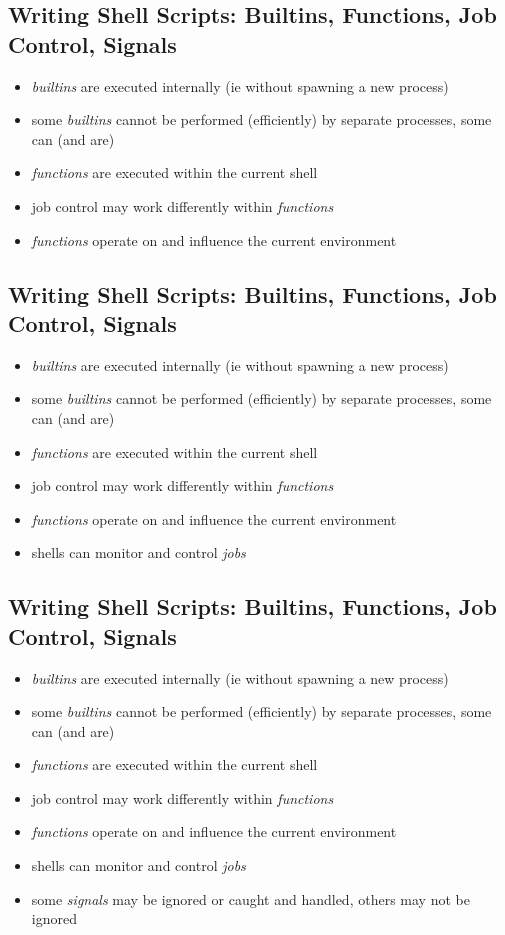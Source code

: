 \documentclass[xga]{xdvislides}
\begin{document}
\subsection{Writing Shell Scripts: Builtins, Functions, Job Control, Signals}
\begin{itemize}
	\item {\em builtins} are executed internally (ie without spawning a
		new process)
	\item some {\em builtins} cannot be performed (efficiently) by
		separate processes, some can (and are)
	\item {\em functions} are executed within the current shell
	\item job control may work differently within {\em functions}
	\item {\em functions} operate on and influence the current environment
\end{itemize}

\subsection{Writing Shell Scripts: Builtins, Functions, Job Control, Signals}
\begin{itemize}
	\item {\em builtins} are executed internally (ie without spawning a
		new process)
	\item some {\em builtins} cannot be performed (efficiently) by
		separate processes, some can (and are)
	\item {\em functions} are executed within the current shell
	\item job control may work differently within {\em functions}
	\item {\em functions} operate on and influence the current environment
	\item shells can monitor and control {\em jobs}
\end{itemize}

\subsection{Writing Shell Scripts: Builtins, Functions, Job Control, Signals}
\begin{itemize}
	\item {\em builtins} are executed internally (ie without spawning a
		new process)
	\item some {\em builtins} cannot be performed (efficiently) by
		separate processes, some can (and are)
	\item {\em functions} are executed within the current shell
	\item job control may work differently within {\em functions}
	\item {\em functions} operate on and influence the current environment
	\item shells can monitor and control {\em jobs}
	\item some {\em signals} may be ignored or caught and handled, others
		may not be ignored
\end{itemize}
\end{document}
